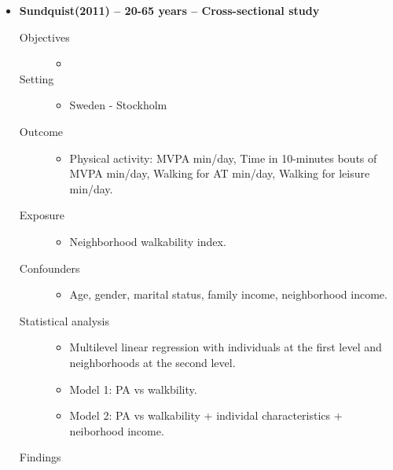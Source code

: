 \documentclass{article}
\begin{document}
\begin{itemize}
\item{\bf Sundquist(2011) -- 20-65 years  -- Cross-sectional study}
		\begin{description}
			\item[Objectives] \mbox{}\par
				\begin{itemize}
					\item
				\end{itemize}
			\item[Setting]\mbox{}\par
				\begin{itemize}
					\item Sweden - Stockholm 
				\end{itemize}
			\item[Outcome] \mbox{}\par
				\begin{itemize}
					\item Physical activity: MVPA min/day, Time in 10-minutes bouts of MVPA min/day, Walking for AT min/day, Walking for leisure min/day. 
				\end{itemize}
			\item[Exposure] \mbox{}\par
				\begin{itemize}
					\item Neighborhood walkability index.  
				\end{itemize}
			\item[Confounders] \mbox{}\par
				\begin{itemize}
					\item Age, gender, marital status, family income, neighborhood income. 
				\end{itemize}
			\item[Statistical analysis] \mbox{}\par
				\begin{itemize}
					\item Multilevel linear regression with individuals at the first level and neighborhoods at the second level. 
					\item Model 1: PA vs walkbility. 
					\item Model 2: PA vs walkability + individal characteristics + neiborhood income. 
				\end{itemize}
			\item[Findings]\mbox{}\par
				\begin{itemize}

\end{itemize}
\end{description}
\end{itemize}
\end{document}
